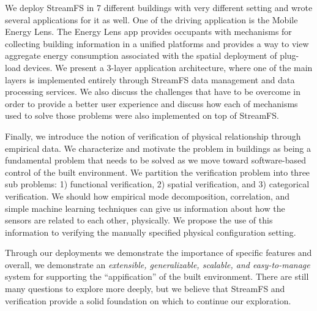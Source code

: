 \documentclass{ucbthesis}
\begin{document}
We deploy StreamFS in 7 different buildings with very different setting and wrote several applications for it as well.  One of the driving
application is the Mobile Energy Lens.  The Energy Lens app provides occupants with mechanisms for collecting building information
in a unified platforms and provides a way to view aggregate energy consumption associated with the spatial deployment
of plug-load devices.  We present a 3-layer application architecture, where one of the main layers is implemented entirely through
StreamFS data management and data processing services.  We also discuss the challenges that have to be overcome in order to
provide a better user experience and discuss how each of mechanisms used to solve those problems were also implemented on top of StreamFS.

Finally, we introduce the notion of verification of physical relationship through empirical data.  We characterize and motivate the problem
in buildings as being a fundamental problem that needs to be solved as we move toward software-based control of the built environment.
We partition the verification problem into three sub problems: 1) functional verification, 2) spatial verification, and 3) categorical
verification.  We should how empirical mode decomposition, correlation, and simple machine learning techniques can give us 
information about how the sensors are related to each other, physically.  We propose the use of this information to 
verifying the manually specified physical configuration setting.

Through our deployments we demonstrate the importance of specific features and overall, we demonstrate an \emph{extensible, generalizable,
scalable, and easy-to-manage} system for supporting the ``appification'' of the built environment.  There are still many
questions to explore more deeply, but we believe that StreamFS and verification provide a solid foundation on which to continue
our exploration.











\appendix


\printbibliography
\end{document}
